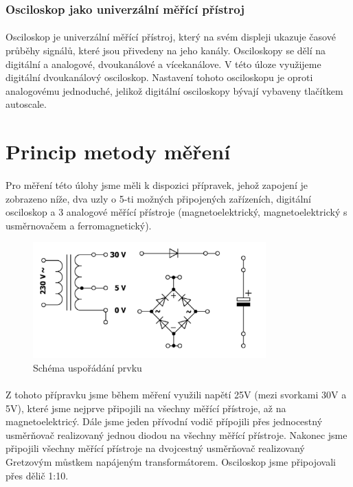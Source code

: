 \documentclass{praktikum}
\begin{document}
\subsubsection{Osciloskop jako univerzální měřící přístroj}
\paragraph{}
Osciloskop je univerzální měřící přístroj, který na svém displeji ukazuje časové průběhy signálů, které jsou přivedeny na jeho kanály. Osciloskopy se dělí na digitální a analogové, dvoukanálové a vícekanálove. V této úloze využijeme digitální dvoukanálový osciloskop. Nastavení tohoto osciloskopu je oproti analogovému jednoduché, jelikož digitální osciloskopy bývají vybaveny tlačítkem autoscale.

\section{Princip metody měření}
\paragraph{}
Pro měření této úlohy jsme měli k dispozici přípravek, jehož zapojení je zobrazeno níže, dva uzly o 5-ti možných připojených zařízeních, digitální osciloskop a 3 analogové měřící přístroje (magnetoelektrický, magnetoelektrický s usměrnovačem a ferromagnetický).

\begin{center}
\begin{figure}[H]
\centering
\includegraphics[width=0.8\textwidth]{schema}
\caption{Schéma uspořádání prvku}
\label{img:schema}
\end{figure}
\end{center}

\paragraph{}
Z tohoto přípravku jsme během měření využili napětí 25V (mezi svorkami 30V a 5V), které jsme nejprve připojili na všechny měřící přístroje, až na magnetoelektricý. Dále jsme jeden přívodní vodič přípojili přes jednocestný usměrňovač realizovaný jednou diodou na všechny měřící přístroje. Nakonec jsme připojili všechny měřící přístroje na dvojcestný usměrňovač realizovaný Gretzovým můstkem napájeným transformátorem. Osciloskop jsme připojovali přes dělič 1:10.
\end{document}

